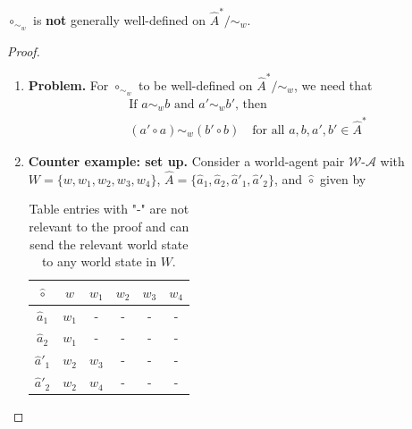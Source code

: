 \begin{proposition}
    $\circ_{\sim_{w}}$ is \textbf{not} generally well-defined on $\hat{A}^{*}/\sim_{w}$.
\end{proposition}
\begin{proof}
\begin{enumerate}[(1)]
    \item \textbf{Problem.}
    For $\circ_{\sim_{w}}$ to be well-defined on $\hat{A}^{*}/\sim_{w}$, we need that
    \begin{equation}
    \begin{aligned}
        & \text{If $a \sim_{w} b$ and $a' \sim_{w} b'$, then} \\
        & (a' \circ a) \sim_{w} (b' \circ b) \quad \text{for all $a, b, a', b' \in \hat{A}^{*}$}
    \end{aligned}
    \end{equation}

    \item \textbf{Counter example: set up.}
    Consider a world-agent pair $\mathscr{W}$-$\mathscr{A}$ with $W = \{w, w_{1}, w_{2}, w_{3}, w_{4} \}$, $\hat{A} = \{ \hat{a}_{1}, \hat{a}_{2}, \hat{a}'_{1}, \hat{a}'_{2} \}$, and $\hat{\circ}$ given by
    \begin{table}[H]
        \centering
        \begin{tabular}{c|ccccc}
           $\hat{\circ}$    & $w$       & $w_{1}$   & $w_{2}$   & $w_{3}$   & $w_{4}$ \\
           \hline
           $\hat{a}_{1}$    & $w_{1}$   & -         & -         & -         & - \\
           $\hat{a}_{2}$    & $w_{1}$   & -         & -         & -         & - \\
           $\hat{a}'_{1}$   & $w_{2}$   & $w_{3}$   & -         & -         & - \\
           $\hat{a}'_{2}$   & $w_{2}$   & $w_{4}$   & -         & -         & - \\
        \end{tabular}
        \caption{
        Table entries with "-" are not relevant to the proof and can send the relevant world state to any world state in $W$.
        }
    \end{table}


\end{enumerate}
\end{proof}
